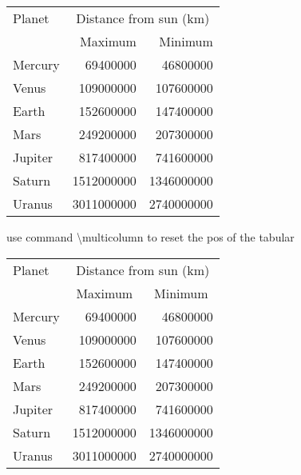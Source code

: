 \documentclass[a4paper, UTF8]{article}
\begin{document}
\begin{center}
\renewcommand{\arraystretch}{1.3}
    \begin{tabular}{|l|r|r|}
        \hline
        \multicolumn{1}{|m{1.5cm}|}{\centering Planet} & \multicolumn{2}{c|}{Distance from sun (km)}\\
        \cline{2-3}
                & Maximum    & Minimum\\
        \hline
        Mercury & 69400000   & 46800000\\ 
        \hline
        Venus & 109000000 & 107600000\\ 
        \hline
        Earth & 152600000 & 147400000\\ 
        \hline
        Mars & 249200000 & 207300000\\ 
        \hline
        Jupiter & 817400000 & 741600000\\ 
        \hline
        Saturn & 1512000000 & 1346000000\\
        \hline
        Uranus & 3011000000 & 2740000000\\ 
        \hline 
    \end{tabular}
\end{center}

use command \textbackslash multicolumn to reset the pos of the tabular

\begin{center}
    \begin{tabular}{|l|r|r|}
        \hline
        Planet & \multicolumn{2}{c|}{Distance from sun (km)}\\
        \cline{2-3}
                & \multicolumn{1}{c|}{Maximum}  & \multicolumn{1}{c|}{Minimum}\\
        \hline
        Mercury & 69400000   & 46800000\\ 
        \hline
        Venus & 109000000 & 107600000\\ 
        \hline
        Earth & 152600000 & 147400000\\ 
        \hline
        Mars & 249200000 & 207300000\\ 
        \hline
        Jupiter & 817400000 & 741600000\\ 
        \hline
        Saturn & 1512000000 & 1346000000\\
        \hline
        Uranus & 3011000000 & 2740000000\\ 
        \hline 
    \end{tabular}
\end{center}
\end{document}
